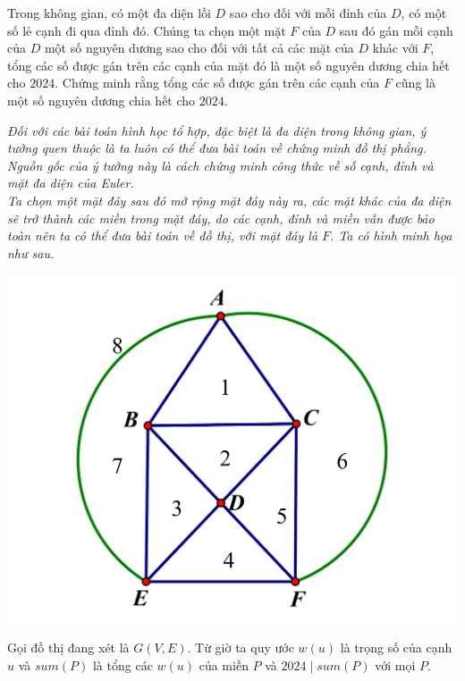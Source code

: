 \documentclass[11pt]{scrartcl}
\begin{document}
\begin{itemize}[label=, leftmargin=0em, itemsep=0.5em]
    \begin{bt}
        Trong không gian, có một đa diện lồi $D$ sao cho đối với mỗi đỉnh của $D$, có một số lẻ cạnh đi qua đỉnh đó. Chúng ta chọn một mặt $F$ của $D$ sau đó gán mỗi cạnh của $D$ một số nguyên dương sao cho đối với tất cả các mặt của $D$ khác với $F$, tổng các số được gán trên các cạnh của mặt đó là một số nguyên dương chia hết cho $2024$. Chứng minh rằng tổng các số được gán trên các cạnh của $F$ cũng là một số nguyên dương chia hết cho $2024$.
    \end{bt}
    \begin{sol}
        \textbf{}\textit{Đối với các bài toán hình học tổ hợp, đặc biệt là đa diện trong không gian, ý tưởng quen thuộc là ta luôn có thể đưa bài toán về chứng minh đồ thị phẳng. Nguồn gốc của ý tưởng này là cách chứng minh công thức về số cạnh, đỉnh và mặt đa diện của Euler.\\
        Ta chọn một mặt đáy sau đó mở rộng mặt đáy này ra, các mặt khác của đa diện sẽ trở thành các miền trong mặt đáy, do các cạnh, đỉnh và miền vẫn được bảo toàn nên ta có thể đưa bài toán về đồ thị, với mặt đáy là $F$. Ta có hình minh họa như sau.}
    
    
    
            \begin{center}
                \includegraphics[scale=0.24]{7.pdf}
            \end{center}

        Gọi đồ thị đang xét là $G(V,E)$. Từ giờ ta quy ước $w(u)$ là trọng số của cạnh $u$ và $sum(P)$ là tổng các $w(u)$ của miền $P$ và $2024 \mid sum(P)$ với mọi $P$.



\end{sol}
\end{itemize}
\end{document}
